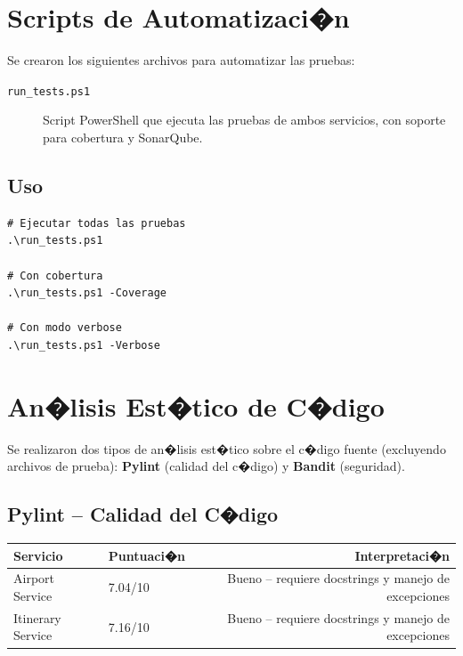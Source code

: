 \documentclass[12pt,a4paper]{article}
\begin{document}
\section{Scripts de Automatizaci�n}

Se crearon los siguientes archivos para automatizar las pruebas:

\begin{description}
  \item[\texttt{run\_tests.ps1}] Script PowerShell que ejecuta las pruebas
        de ambos servicios, con soporte para cobertura y SonarQube.
\end{description}

\subsection{Uso}
\vspace{0.3cm}
\begin{lstlisting}[style=bashstyle]
# Ejecutar todas las pruebas
.\run_tests.ps1

# Con cobertura
.\run_tests.ps1 -Coverage

# Con modo verbose
.\run_tests.ps1 -Verbose
\end{lstlisting}

\section{An�lisis Est�tico de C�digo}

Se realizaron dos tipos de an�lisis est�tico sobre el c�digo fuente
(excluyendo archivos de prueba): \textbf{Pylint} (calidad del c�digo) y
\textbf{Bandit} (seguridad).

\subsection{Pylint -- Calidad del C�digo}

\begin{tabularx}{\textwidth}{lXr}
  \toprule
  \textbf{Servicio} & \textbf{Puntuaci�n} & \textbf{Interpretaci�n} \\
  \midrule
  Airport Service & 7.04/10 & Bueno -- requiere docstrings y manejo de excepciones \\
  Itinerary Service & 7.16/10 & Bueno -- requiere docstrings y manejo de excepciones \\
  \bottomrule
\end{tabularx}
\end{document}
